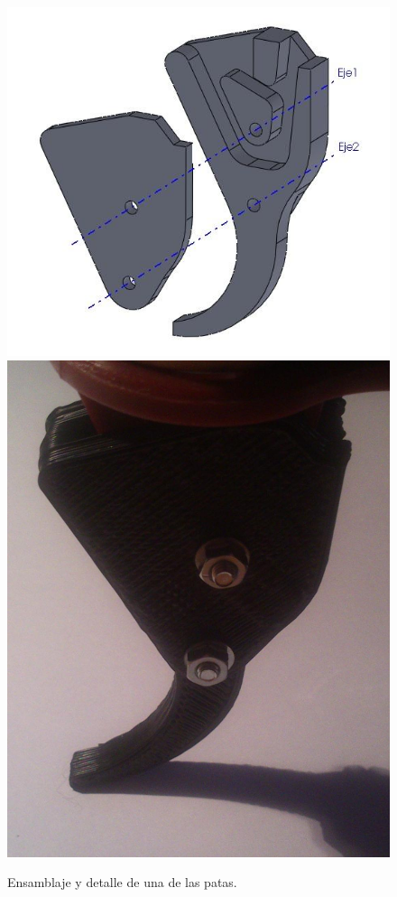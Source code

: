 \documentclass[twoside,11pt]{book}
\begin{document}
\begin{figure}[h!]
\begin{center}
\includegraphics[scale=0.32,bb=0 0 500 400]{images/ensamblaje_pata.png} \hspace{1.5cm}
\includegraphics[scale=0.12,bb=0 0 948 1228]{images/detalle_pata.png}
\end{center}
\caption{Ensamblaje y detalle de una de las patas.}
\end{figure}
\end{document}

